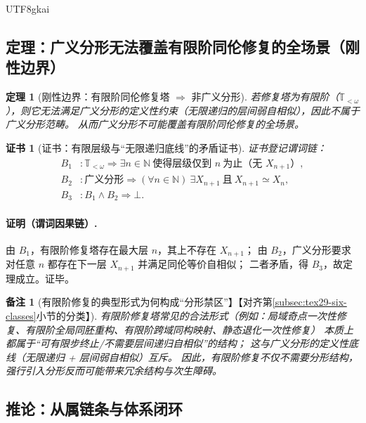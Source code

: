 \documentclass[12pt]{article}
\newtheorem{theorem}{定理}[section]
\newtheorem{remark}{备注}[section]
\newtheorem{Certificate}{证书}[section]
\newcommand{\NN}{\mathbb{N}}
\begin{document}
\begin{CJK*}{UTF8}{gkai}
\subsection{定理：广义分形无法覆盖有限阶同伦修复的全场景（刚性边界）}
\label{subsec:tex29-boundary-finite-not-covered}

\begin{theorem}[刚性边界：有限阶同伦修复塔 $\Rightarrow$ 非广义分形]
\label{thm:tex29-finite-tower-not-fractal}
若修复塔为有限阶（$\mathbb{T}_{<\omega}$），则它无法满足广义分形的定义性约束（无限递归的层间弱自相似），因此不属于广义分形范畴。
从而广义分形不可能覆盖有限阶同伦修复的全场景。
\end{theorem}

\begin{Certificate}[证书：有限层级与“无限递归底线”的矛盾证书]
\label{cert:tex29-finite-tower-not-fractal}
证书登记谓词链：
\[
\begin{aligned}
  B_1 &: \mathbb{T}_{<\omega}\Rightarrow \exists n\in\NN\ \text{使得层级仅到 }n\ \text{为止（无 }X_{n+1}\text{）},\\
  B_2 &: \text{广义分形}\Rightarrow (\forall n\in\NN)\ \exists X_{n+1}\ \text{且}\ X_{n+1}\simeq X_n,\\
  B_3 &: B_1\wedge B_2\Rightarrow \bot.
\end{aligned}
\]
\end{Certificate}

\paragraph{证明（谓词因果链）.}
由 $B_1$，有限阶修复塔存在最大层 $n$，其上不存在 $X_{n+1}$；
由 $B_2$，广义分形要求对任意 $n$ 都存在下一层 $X_{n+1}$ 并满足同伦等价自相似；
二者矛盾，得 $B_3$，故定理成立。证毕。

\begin{remark}[有限阶修复的典型形式为何构成“分形禁区”】【对齐第\ref{subsec:tex29-six-classes}小节的分类】]
有限阶修复塔常见的合法形式（例如：局域奇点一次性修复、有限阶全局同胚重构、有限阶跨域同构映射、静态退化一次性修复）
本质上都属于“可有限步终止/不需要层间递归自相似”的结构；
这与广义分形的定义性底线（无限递归 + 层间弱自相似）互斥。
因此，有限阶修复不仅\emph{不需要}分形结构，强行引入分形反而可能带来冗余结构与次生障碍。
\end{remark}

\subsection{推论：从属链条与体系闭环}
\label{subsec:tex29-subordination-chain}


\end{CJK*}
\end{document}
